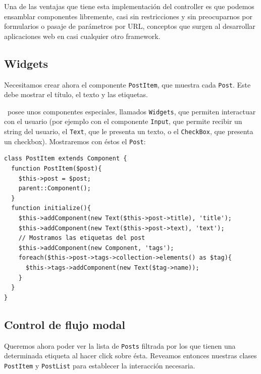 Una de las ventajas que tiene esta implementación del controller es que podemos ensamblar componentes libremente, casi sin restricciones y sin preocuparnos por formularios o pasaje de parámetros por URL, conceptos que surgen al desarrollar aplicaciones web en casi cualquier otro framework.

\subsection{Widgets}
\label{sub-widget}

Necesitamos crear ahora el componente \verb'PostItem', que muestra cada \verb'Post'. Este debe mostrar el título, el texto y las etiquetas.

\PWB\ posee unos componentes especiales, llamados \verb"Widgets"\cite{WDGTS}, que permiten interactuar con el usuario (por ejemplo con el componente \verb"Input", que permite recibir un string del usuario, el \verb"Text", que le presenta un texto, o el \verb"CheckBox", que presenta un checkbox). Mostraremos con éstos el \verb'Post':

\begin{verbatim}
class PostItem extends Component {
  function PostItem($post){
    $this->post = $post;
    parent::Component();
  }
  function initialize(){
    $this->addComponent(new Text($this->post->title), 'title');
    $this->addComponent(new Text($this->post->text), 'text');
    // Mostramos las etiquetas del post
    $this->addComponent(new Component, 'tags');
    foreach($this->post->tags->collection->elements() as $tag){
      $this->tags->addComponent(new Text($tag->name));
    }
  }
}
\end{verbatim}

\subsection{Control de flujo modal}
\label{sub-modal-flow}
Queremos ahora poder ver la lista de \verb"Posts" filtrada por los que tienen una determinada etiqueta al hacer click sobre ésta. Reveamos entonces nuestras clases \verb"PostItem" y \verb"PostList" para establecer la interacción necesaria.


